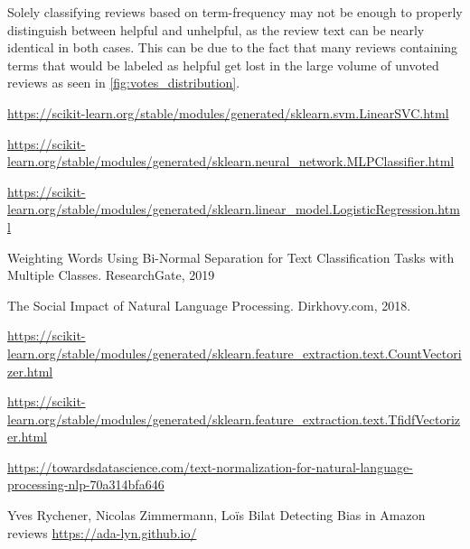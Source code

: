 \documentclass[twoside,twocolumn]{article}
\begin{document}
Solely classifying reviews based on term-frequency may not be enough to properly distinguish between helpful and unhelpful, as the review text can be nearly identical in both cases. This can be due to the fact that many reviews containing terms that would be labeled as helpful get lost in the large volume of unvoted reviews as seen in \figurename{\ref{fig:votes_distribution}}.


\begin{thebibliography}{99} %

	\url{https://scikit-learn.org/stable/modules/generated/sklearn.svm.LinearSVC.html}

	\url{https://scikit-learn.org/stable/modules/generated/sklearn.neural_network.MLPClassifier.html}

	\url{https://scikit-learn.org/stable/modules/generated/sklearn.linear_model.LogisticRegression.html}

	\newblock Weighting Words Using Bi-Normal Separation for Text Classification Tasks with Multiple Classes. ResearchGate, 2019

	\newblock The Social Impact of Natural Language Processing. Dirkhovy.com, 2018.

	\url{https://scikit-learn.org/stable/modules/generated/sklearn.feature_extraction.text.CountVectorizer.html}

	\url{https://scikit-learn.org/stable/modules/generated/sklearn.feature_extraction.text.TfidfVectorizer.html}

	\url{https://towardsdatascience.com/text-normalization-for-natural-language-processing-nlp-70a314bfa646}

	Yves Rychener, Nicolas Zimmermann, Loïs Bilat
	\newblock Detecting Bias in Amazon reviews
	\url{https://ada-lyn.github.io/}
\end{thebibliography}

\end{document}
